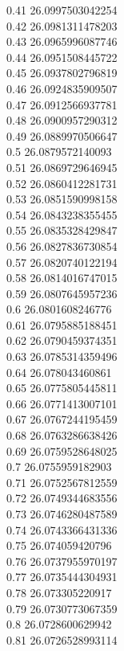 {0.41	26.0997503042254\\
0.42	26.0981311478203\\
0.43	26.0965996087746\\
0.44	26.0951508445722\\
0.45	26.0937802796819\\
0.46	26.0924835909507\\
0.47	26.0912566937781\\
0.48	26.0900957290312\\
0.49	26.0889970506647\\
0.5	26.0879572140093\\
0.51	26.0869729646945\\
0.52	26.0860412281731\\
0.53	26.0851590998158\\
0.54	26.0843238355455\\
0.55	26.0835328429847\\
0.56	26.0827836730854\\
0.57	26.0820740122194\\
0.58	26.0814016747015\\
0.59	26.0807645957236\\
0.6	26.0801608246776\\
0.61	26.0795885188451\\
0.62	26.0790459374351\\
0.63	26.0785314359496\\
0.64	26.078043460861\\
0.65	26.0775805445811\\
0.66	26.0771413007101\\
0.67	26.0767244195459\\
0.68	26.0763286638426\\
0.69	26.0759528648025\\
0.7	26.0755959182903\\
0.71	26.0752567812559\\
0.72	26.0749344683556\\
0.73	26.0746280487589\\
0.74	26.0743366431336\\
0.75	26.074059420796\\
0.76	26.0737955970197\\
0.77	26.0735444304931\\
0.78	26.073305220917\\
0.79	26.0730773067359\\
0.8	26.0728600629942\\
0.81	26.0726528993114\\
}
